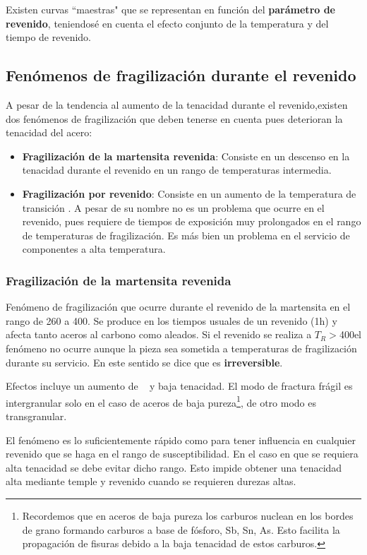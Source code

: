 Existen curvas ``maestras"{} que se representan en función del \textbf{parámetro de revenido}, teniendosé en cuenta el efecto conjunto de la temperatura y del tiempo de revenido. 

\subsection{Fenómenos de fragilización durante el revenido}
A pesar de la tendencia al aumento de la tenacidad durante el revenido,existen dos fenómenos de fragilización que deben tenerse en cuenta pues deterioran la tenacidad del acero:

\begin{itemize}
    \item \textbf{Fragilización de la martensita revenida}: Consiste en un descenso en la tenacidad durante el revenido en un rango de temperaturas intermedia.
    \item \textbf{Fragilización por revenido}: Consiste en un aumento de la temperatura de transición \Tdf. A pesar de su nombre no es un problema que ocurre en el revenido, pues requiere de tiempos de exposición muy prolongados en el rango de temperaturas de fragilización. Es más bien un problema en el servicio de componentes a alta temperatura.
\end{itemize}

\subsubsection{Fragilización de la martensita revenida}
Fenómeno de fragilización que ocurre durante el revenido de la martensita en el rango de 260 a 400\grad{}. Se produce en los tiempos usuales de un revenido (1h) y afecta tanto aceros al carbono como aleados. Si el revenido se realiza a $T_R>$400\grad el fenómeno no ocurre aunque la pieza sea sometida a temperaturas de fragilización durante su servicio. En este sentido se dice que es \textbf{irreversible}.

Efectos incluye un aumento de \Tdf~ y baja tenacidad. El modo de fractura frágil es intergranular solo en el caso de aceros de baja pureza\footnote{Recordemos que en aceros de baja pureza los carburos nuclean en los bordes de grano formando carburos a base de fósforo, Sb, Sn, As. Esto facilita la propagación de fisuras debido a la baja tenacidad de estos carburos.}, de otro modo es transgranular.

El fenómeno es lo suficientemente rápido como para tener influencia en cualquier revenido que se haga en el rango de susceptibilidad. En el caso en que se requiera alta tenacidad se debe evitar dicho rango. Esto impide obtener una tenacidad alta mediante temple y revenido cuando se requieren durezas altas.

